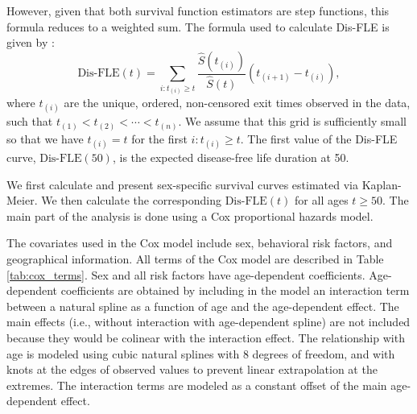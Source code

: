 \documentclass[risks,article,submit,moreauthors,pdftex]{Definitions/mdpi}
\begin{document}
However, given that both survival function estimators are step
functions, this formula reduces to a weighted sum. The formula used to
calculate Dis-FLE is given by : \[
\text{Dis-FLE}(t) =
  \sum_{i : t_{(i)} \geq t} \frac{\hat{S}(t_{(i)})}{\hat{S}(t)}(t_{(i+1)} - t_{(i)}),
\] where \(t_{(i)}\) are the unique, ordered, non-censored exit times
observed in the data, such that
\(t_{(1)} < t_{(2)} < \cdots < t_{(n)}\). We assume that this grid is
sufficiently small so that we have \(t_{(i)} = t\) for the first
\(i : t_{(i)} \geq t\). The first value of the Dis-FLE curve,
\(\text{Dis-FLE}(50)\), is the expected disease-free life duration at
50.

We first calculate and present sex-specific survival curves estimated
via Kaplan-Meier. We then calculate the corresponding
\(\text{Dis-FLE}(t)\) for all ages \(t \geq 50\). The main part of the
analysis is done using a Cox proportional hazards model.

The covariates used in the Cox model include sex, behavioral risk
factors, and geographical information. All terms of the Cox model are
described in Table \ref{tab:cox_terms}. Sex and all risk factors have
age-dependent coefficients. Age-dependent coefficients are obtained by
including in the model an interaction term between a natural spline as a
function of age and the age-dependent effect. The main effects (i.e.,
without interaction with age-dependent spline) are not included because
they would be colinear with the interaction effect. The relationship
with age is modeled using cubic natural splines with 8 degrees of
freedom, and with knots at the edges of observed values to prevent
linear extrapolation at the extremes. The interaction terms are modeled
as a constant offset of the main age-dependent effect.
\end{document}
